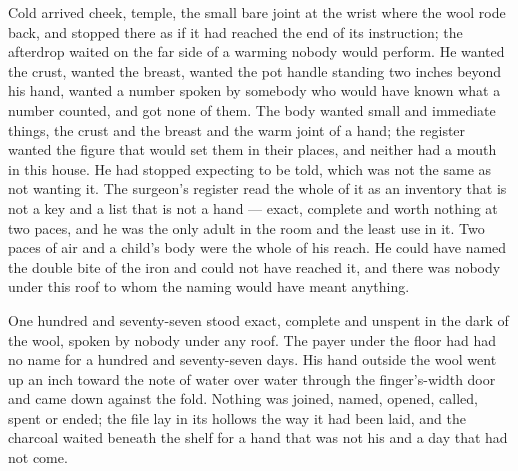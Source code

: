 Cold arrived cheek, temple, the small bare joint at the wrist where the wool rode back, and stopped there as if it had reached the end of its instruction; the afterdrop waited on the far side of a warming nobody would perform. He wanted the crust, wanted the breast, wanted the pot handle standing two inches beyond his hand, wanted a number spoken by somebody who would have known what a number counted, and got none of them. The body wanted small and immediate things, the crust and the breast and the warm joint of a hand; the register wanted the figure that would set them in their places, and neither had a mouth in this house. He had stopped expecting to be told, which was not the same as not wanting it. The surgeon's register read the whole of it as an inventory that is not a key and a list that is not a hand --- exact, complete and worth nothing at two paces, and he was the only adult in the room and the least use in it. Two paces of air and a child's body were the whole of his reach. He could have named the double bite of the iron and could not have reached it, and there was nobody under this roof to whom the naming would have meant anything.

One hundred and seventy-seven stood exact, complete and unspent in the dark of the wool, spoken by nobody under any roof. The payer under the floor had had no name for a hundred and seventy-seven days. His hand outside the wool went up an inch toward the note of water over water through the finger's-width door and came down against the fold. Nothing was joined, named, opened, called, spent or ended; the file lay in its hollows the way it had been laid, and the charcoal waited beneath the shelf for a hand that was not his and a day that had not come.
